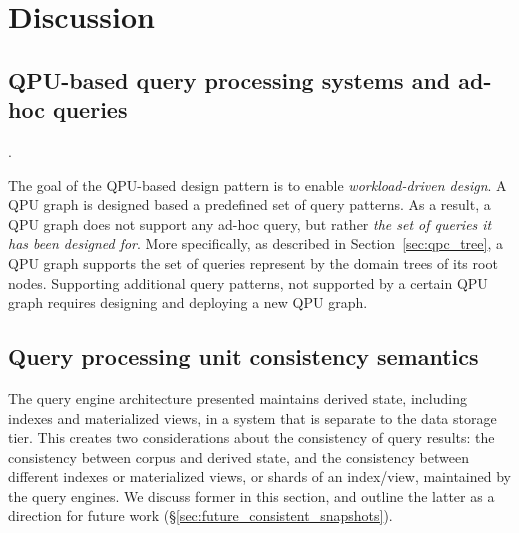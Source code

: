

\section{Discussion}

\subsection{QPU-based query processing systems and ad-hoc queries}.

The goal of the QPU-based design pattern is to enable \textit{workload-driven design}.
A QPU graph is designed based a predefined set of query patterns.
As a result, a QPU graph does not support any ad-hoc query,
but rather \textit{the set of queries it has been designed for}.
More specifically, as described in Section~\ref{sec:qpc_tree}, a QPU graph supports the set of queries represent by the domain trees of its root nodes.
Supporting additional query patterns, not supported by a certain QPU graph requires designing and deploying a
new QPU graph.


\subsection{Query processing unit consistency semantics}

The query engine architecture presented maintains derived state, including indexes and materialized views,
in a system that is separate to the data storage tier.
This creates two considerations about the consistency of query results:
the consistency between corpus and derived state,
and the consistency between different indexes or materialized views, or shards of an index/view,
maintained by the query engines.
We discuss former in this section, and outline the latter as a direction for future work (\S\ref{sec:future_consistent_snapshots}).

